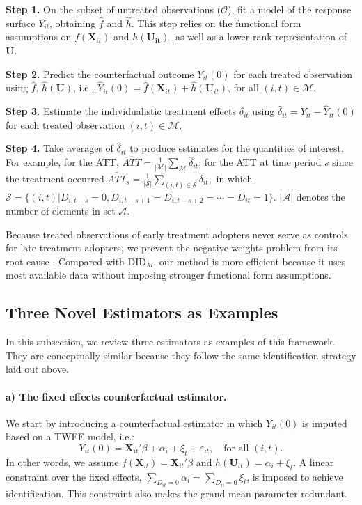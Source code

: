 \documentclass[12pt]{article}
\begin{document}
\begin{adjustwidth}{0pt}{0pt}

\noindent\textbf{Step 1.} On the subset of untreated observations ($\mathcal{O}$), fit a model of the response surface $Y_{it}$, obtaining $\hat f$ and $\hat h$. This step relies on the functional form assumptions on $f(\mathbf{X}_{it})$ and $h(\mathbf{U_{it}})$, as well as a lower-rank representation of $\mathbf{U}$. 

\noindent\textbf{Step 2.} Predict the counterfactual outcome $Y_{it}(0)$ for each treated observation using $\hat f$, $\hat h(\mathbf{U})$, i.e., $\hat Y_{it}(0) = \hat f(\mathbf{X}_{it}) + \hat h(\mathbf{U}_{it})$, for all $(i,t)\in\mathcal{M}$.

\noindent\textbf{Step 3.} Estimate the individualistic treatment effects $\delta_{it}$ using $\hat \delta_{it} = Y_{it} - \hat Y_{it}(0)$ for each treated observation $(i,t)\in\mathcal{M}$. 

\noindent\textbf{Step 4.} Take averages of $\hat\delta_{it}$ to produce estimates for the quantities of interest. For example, for the ATT,
  $\widehat{ATT} = \frac{1}{|\mathcal{M}|} \sum_{\mathcal{M}} \hat \delta_{it}$; for the ATT at time period $s$ since the treatment occurred $\widehat{ATT}_{s} = \frac{1}{|\mathcal{S}|} \sum_{(i,t)\in\mathcal{S}}\hat{\delta}_{it},$ in which $\mathcal{S} = \{(i,t)| D_{i,t-s}=0,D_{i,t-s+1} = D_{i,t-s+2} = \cdots =
  D_{it} = 1\}$. $|\mathcal{A}|$ denotes the number of elements in set $\mathcal{A}$.
\end{adjustwidth}

Because treated observations of early treatment adopters never serve as controls for late treatment adopters, we prevent the negative weights problem from its root cause \citep{Goodman-Bacon2018,de_Chaisemartin2018-iw}. Compared with DID$_{M}$, our method is more efficient because it uses most available data without imposing stronger functional form assumptions. 


\subsection{Three Novel Estimators as Examples} 

In this subsection, we review three estimators as examples of this framework. They are conceptually similar because they follow the same identification strategy laid out above.

\paragraph{a) The fixed effects counterfactual estimator.} We start by introducing a counterfactual estimator in which $Y_{it}(0)$ is imputed based on a TWFE model, i.e.:
$$Y_{it}(0) = \mathbf{X}_{it}'\beta + \alpha_{i} + \xi_{t} +
  \varepsilon_{it},\quad\text{for all } (i, t).$$
In other words, we assume $f(\mathbf{X}_{it}) =  \mathbf{X}_{it}'\beta$ and $h(\mathbf{U}_{it}) = \alpha_{i} + \xi_{t}$. A linear constraint over the fixed effects, $\sum_{D_{it}=0}\alpha_{i} = \sum_{D_{it}=0}\xi_{t}$, is imposed to achieve identification. This constraint also makes the grand mean parameter redundant.
\end{document}
